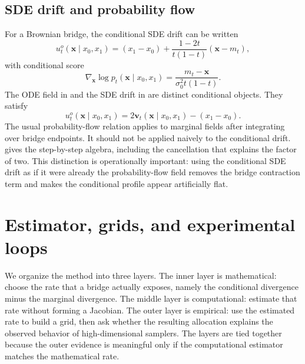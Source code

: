 \documentclass{article}
\newcommand{\vx}{\bm{x}}
\newcommand{\vv}{\bm{v}}
\theoremstyle{plain}
\theoremstyle{definition}
\theoremstyle{remark}
\begin{document}
\subsection{SDE drift and probability flow}
\label{sec:sde_ode}

For a Brownian bridge, the conditional SDE drift can be written
\begin{equation}
  u^o_t(\vx\mid x_0,x_1)
  =
  (x_1-x_0)
  +
  \frac{1-2t}{t(1-t)}(\vx-m_t),
  \label{eq:bb_sde_drift}
\end{equation}
with conditional score
\begin{equation}
  \nabla_{\vx}\log p_t(\vx\mid x_0,x_1)
  =
  \frac{m_t-\vx}{\sigma_0^2t(1-t)}.
  \label{eq:bb_cond_score}
\end{equation}
The ODE field in  and the SDE drift in  are distinct conditional objects. They satisfy
\begin{equation}
  u^o_t(\vx\mid x_0,x_1)
  =
  2\vv_t(\vx\mid x_0,x_1)-(x_1-x_0).
  \label{eq:sde_ode_cond_relation}
\end{equation}
The usual probability-flow relation applies to marginal fields after integrating over bridge endpoints. It should not be applied naively to the conditional drift.  gives the step-by-step algebra, including the cancellation that explains the factor of two. This distinction is operationally important: using the conditional SDE drift as if it were already the probability-flow field removes the bridge contraction term and makes the conditional profile appear artificially flat.

\section{Estimator, grids, and experimental loops}
\label{sec:estimator}

We organize the method into three layers. The inner layer is mathematical: choose the rate that a bridge actually exposes, namely the conditional divergence minus the marginal divergence. The middle layer is computational: estimate that rate without forming a Jacobian. The outer layer is empirical: use the estimated rate to build a grid, then ask whether the resulting allocation explains the observed behavior of high-dimensional samplers. The layers are tied together because the outer evidence is meaningful only if the computational estimator matches the mathematical rate.
\end{document}
